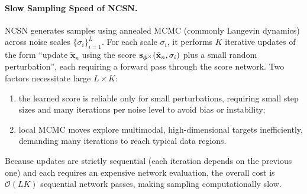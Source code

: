 \paragraph{Slow Sampling Speed of NCSN.}
NCSN generates samples using annealed MCMC (commonly Langevin dynamics) across noise scales $\{\sigma_i\}_{i=1}^L$.  
For each scale $\sigma_i$, it performs $K$ iterative updates of the form ``update $\tilde{\mathbf{x}}_n$ using the score ${\mathbf{s}}_{\bm{\phi}^\times}(\tilde{\mathbf{x}}_n,\sigma_i)$ plus a small random perturbation'', each requiring a forward pass through the score network. Two factors necessitate large $L \times K$:  
\begin{enumerate}
    \item[(i)]  the learned score is reliable only for small perturbations, requiring small step sizes and many iterations per noise level to avoid bias or instability;
    \item[(ii)]  local MCMC moves explore multimodal, high-dimensional targets inefficiently, demanding many iterations to reach typical data regions.
\end{enumerate}
Because updates are strictly sequential (each iteration depends on the previous one) and each requires an expensive network evaluation, the overall cost is $\mathcal{O}(L  K)$ sequential network passes, making sampling computationally slow.





